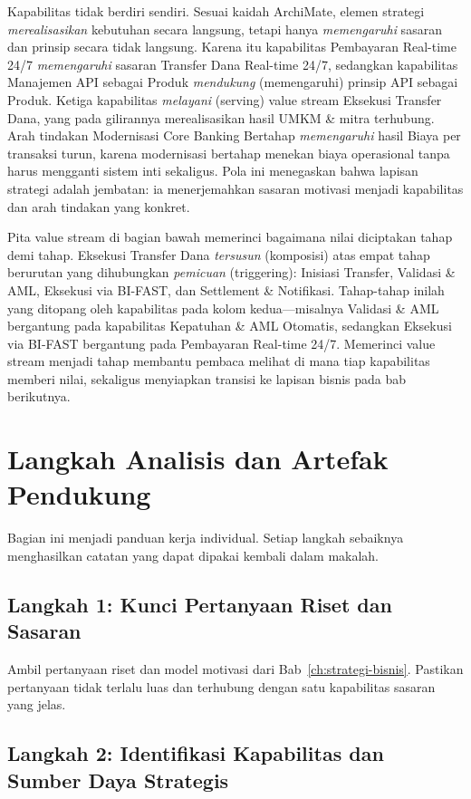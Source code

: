 Kapabilitas tidak berdiri sendiri. Sesuai kaidah ArchiMate, elemen strategi
\emph{merealisasikan} kebutuhan secara langsung, tetapi hanya \emph{memengaruhi}
sasaran dan prinsip secara tidak langsung. Karena itu kapabilitas Pembayaran
Real-time 24/7 \emph{memengaruhi} sasaran Transfer Dana Real-time 24/7, sedangkan
kapabilitas Manajemen API sebagai Produk \emph{mendukung} (memengaruhi) prinsip
API sebagai Produk. Ketiga kapabilitas \emph{melayani} (serving) value stream
Eksekusi Transfer Dana, yang pada gilirannya merealisasikan hasil UMKM \& mitra
terhubung. Arah tindakan
Modernisasi Core Banking Bertahap \emph{memengaruhi} hasil Biaya per transaksi
turun, karena modernisasi bertahap menekan biaya operasional tanpa harus
mengganti sistem inti sekaligus. Pola ini menegaskan bahwa lapisan strategi
adalah jembatan: ia menerjemahkan sasaran motivasi menjadi kapabilitas dan arah
tindakan yang konkret.

Pita value stream di bagian bawah memerinci bagaimana nilai diciptakan tahap
demi tahap. Eksekusi Transfer Dana \emph{tersusun} (komposisi) atas empat tahap
berurutan yang dihubungkan \emph{pemicuan} (triggering): Inisiasi Transfer,
Validasi \& AML, Eksekusi via BI-FAST, dan Settlement \& Notifikasi. Tahap-tahap
inilah yang ditopang oleh kapabilitas pada kolom kedua---misalnya Validasi \& AML
bergantung pada kapabilitas Kepatuhan \& AML Otomatis, sedangkan Eksekusi via
BI-FAST bergantung pada Pembayaran Real-time 24/7. Memerinci value stream menjadi
tahap membantu pembaca melihat di mana tiap kapabilitas memberi nilai, sekaligus
menyiapkan transisi ke lapisan bisnis pada bab berikutnya.

\section{Langkah Analisis dan Artefak Pendukung}

Bagian ini menjadi panduan kerja individual. Setiap langkah sebaiknya
menghasilkan catatan yang dapat dipakai kembali dalam makalah.

\subsection{Langkah 1: Kunci Pertanyaan Riset dan Sasaran}

Ambil pertanyaan riset dan model motivasi dari Bab~\ref{ch:strategi-bisnis}.
Pastikan pertanyaan tidak terlalu luas dan terhubung dengan satu kapabilitas
sasaran yang jelas.

\subsection{Langkah 2: Identifikasi Kapabilitas dan Sumber Daya Strategis}


